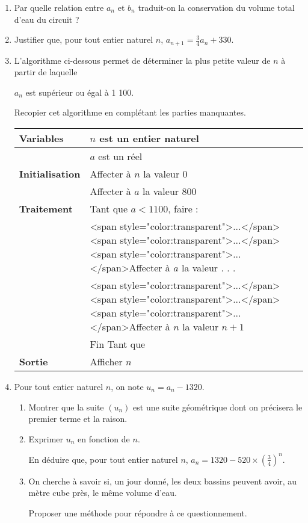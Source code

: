 \begin{enumerate}
     \item
     Par quelle relation entre $a_{n}$  et $b_{n}$  traduit-on la conservation du volume total d'eau du circuit ?
     \item
     Justifier que, pour tout entier naturel $n$, $a_{n+1} =\frac{3}{4}a_{n} + 330$.
     \item
     L'algorithme ci-dessous permet de déterminer la plus petite valeur de $n$ à partir de laquelle
     \par
     $a_{n}$ est supérieur ou égal à 1 100.
     \par
     Recopier cet algorithme en complétant les parties manquantes.

     \begin{tabularx}{0.8\linewidth}{|*{3}{>{\centering \arraybackslash }X|}}%
          \hline
          \textbf{Variables}  &  $n$ est un entier naturel
          \\ \hline
          & $a$ est un réel
          \\ \hline
          \textbf{Initialisation}  & Affecter à $n$ la valeur $0$
          \\ \hline
          & Affecter à $a$ la valeur $800$
          \\ \hline
          \textbf{Traitement	}  & Tant que $a < 1 100$, faire :
          \\ \hline
          & <span style="color:transparent">...</span><span style="color:transparent">...</span><span style="color:transparent">...</span>Affecter à $a$ la valeur . . .
          \\ \hline
          & <span style="color:transparent">...</span><span style="color:transparent">...</span><span style="color:transparent">...</span>Affecter à $n$ la valeur $n + 1$
          \\ \hline
          & Fin Tant que
          \\ \hline
          \textbf{Sortie}  & Afficher $n$
          \\ \hline
     \end{tabularx}
\item
Pour tout entier naturel $n$, on note $u_{n} = a_{n}-1 320$.
\begin{enumerate} [label=\alph*.]
     \item
     Montrer que la suite $\left(u_{n} \right)$ est une suite géométrique dont on précisera le premier terme et la raison.
     \item
     Exprimer $u_{n}$ en fonction de $n$.
     \par
     En déduire que, pour tout entier naturel $n$, $a_{n} = 1 320-520\times \left(\frac{3}{4}\right)^{n}$.
     \item
     On cherche à savoir si, un jour donné, les deux bassins peuvent avoir, au mètre cube près, le même volume d'eau.
     \par
     Proposer une méthode pour répondre à ce questionnement.
\end{enumerate}
\end{enumerate}
\begin{corrige}
\end{corrige}

